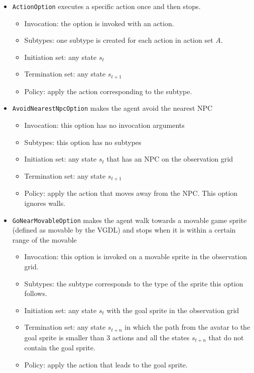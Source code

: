 \begin{itemize}
	\item \texttt{ActionOption} executes a specific action once and then
		stops.
		\begin{itemize}
			\item Invocation: the option is invoked with an action.
			\item Subtypes: one subtype is created for each action in action set
				$A$.
			\item Initiation set: any state $s_t$
			\item Termination set: any state $s_{t+1}$
			\item Policy: apply the action corresponding to the subtype.
		\end{itemize}
	\item \texttt{AvoidNearestNpcOption} makes the agent avoid the nearest NPC
		\begin{itemize}
			\item Invocation: this option has no invocation arguments
			\item Subtypes: this option has no subtypes
			\item Initiation set: any state $s_t$ that has an NPC on the
				observation grid
			\item Termination set: any state $s_{t+1}$
			\item Policy: apply the action that moves away from the NPC. This
				option ignores walls.
		\end{itemize}
	\item \texttt{GoNearMovableOption} makes the agent walk towards a
		movable game sprite (defined as movable by the VGDL) and stops when it
		is within a certain range of the movable
		\begin{itemize}
			\item Invocation: this option is invoked on a movable sprite in the
				observation grid.
			\item Subtypes: the subtype corresponds to the type of the sprite
				this option follows.
			\item Initiation set: any state $s_t$ with the goal sprite in the observation grid
			\item Termination set: any state $s_{t+n}$ in which the path from
				the avatar to the goal sprite is smaller than 3 actions and all the states
				$s_{t+n}$ that do not contain the goal sprite.
			\
			\item Policy: apply the action that leads to the goal sprite.
		\end{itemize}

\end{itemize}
